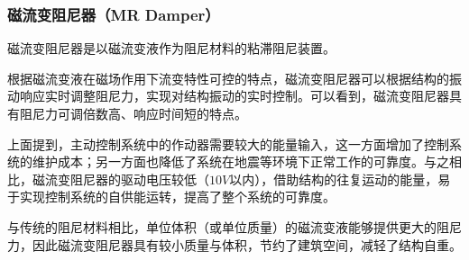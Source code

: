 \subsubsection{磁流变阻尼器（MR Damper）}
磁流变阻尼器是以磁流变液作为阻尼材料的粘滞阻尼装置。

根据磁流变液在磁场作用下流变特性可控的特点，磁流变阻尼器可以根据结构的振动响应实时调整阻尼力，实现对结构振动的实时控制。可以看到，磁流变阻尼器具有阻尼力可调倍数高、响应时间短的特点\cite{Zhang2010}。

上面提到，主动控制系统中的作动器需要较大的能量输入，这一方面增加了控制系统的维护成本；另一方面也降低了系统在地震等环境下正常工作的可靠度。与之相比，磁流变阻尼器的驱动电压较低（$10V$以内），借助结构的往复运动的能量，易于实现控制系统的自供能运转，提高了整个系统的可靠度。

与传统的阻尼材料相比，单位体积（或单位质量）的磁流变液能够提供更大的阻尼力，因此磁流变阻尼器具有较小质量与体积，节约了建筑空间，减轻了结构自重。
